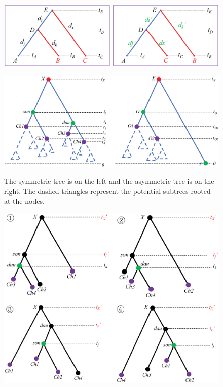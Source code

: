 \documentclass{bmcart}
\begin{document}
\begin{backmatter}
\begin{figure}[h!]
\includegraphics[width=12cm]{exchangemethod.eps}\\
\caption{
             }
\label{exchangemethod}
\end{figure}

\begin{figure}[h!]
\includegraphics[width=12cm]{treeshape.eps}\\
\caption{
             The symmetric tree is on the left and the asymmetric tree is on the right. The dashed triangles represent the potential subtrees rooted at the nodes.}
\label{treeshape}
\end{figure}

\begin{figure}[h!]
\includegraphics[width=12cm]{symmetric.eps}\\
\caption{
             }
\label{symmetric}
\end{figure}


\end{backmatter}
\end{document}
